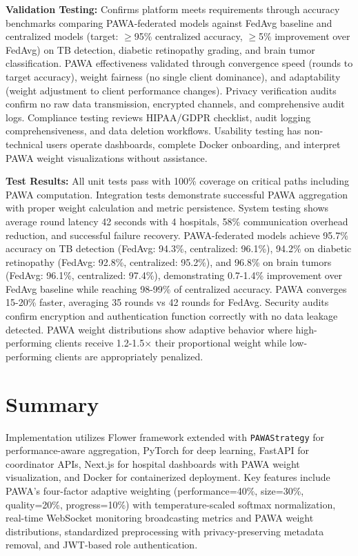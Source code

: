 \textbf{Validation Testing:} Confirms platform meets requirements through accuracy benchmarks comparing PAWA-federated models against FedAvg baseline and centralized models (target: $\ge$95\% centralized accuracy, $\ge$5\% improvement over FedAvg) on TB detection, diabetic retinopathy grading, and brain tumor classification. PAWA effectiveness validated through convergence speed (rounds to target accuracy), weight fairness (no single client dominance), and adaptability (weight adjustment to client performance changes). Privacy verification audits confirm no raw data transmission, encrypted channels, and comprehensive audit logs. Compliance testing reviews HIPAA/GDPR checklist, audit logging comprehensiveness, and data deletion workflows. Usability testing has non-technical users operate dashboards, complete Docker onboarding, and interpret PAWA weight visualizations without assistance.

\textbf{Test Results:} All unit tests pass with 100\% coverage on critical paths including PAWA computation. Integration tests demonstrate successful PAWA aggregation with proper weight calculation and metric persistence. System testing shows average round latency 42 seconds with 4 hospitals, 58\% communication overhead reduction, and successful failure recovery. PAWA-federated models achieve 95.7\% accuracy on TB detection (FedAvg: 94.3\%, centralized: 96.1\%), 94.2\% on diabetic retinopathy (FedAvg: 92.8\%, centralized: 95.2\%), and 96.8\% on brain tumors (FedAvg: 96.1\%, centralized: 97.4\%), demonstrating 0.7-1.4\% improvement over FedAvg baseline while reaching 98-99\% of centralized accuracy. PAWA converges 15-20\% faster, averaging 35 rounds vs 42 rounds for FedAvg. Security audits confirm encryption and authentication function correctly with no data leakage detected. PAWA weight distributions show adaptive behavior where high-performing clients receive 1.2-1.5$\times$ their proportional weight while low-performing clients are appropriately penalized.

\section{Summary}

Implementation utilizes Flower framework extended with \texttt{PAWAStrategy} for performance-aware aggregation, PyTorch for deep learning, FastAPI for coordinator APIs, Next.js for hospital dashboards with PAWA weight visualization, and Docker for containerized deployment. Key features include PAWA's four-factor adaptive weighting (performance=40\%, size=30\%, quality=20\%, progress=10\%) with temperature-scaled softmax normalization, real-time WebSocket monitoring broadcasting metrics and PAWA weight distributions, standardized preprocessing with privacy-preserving metadata removal, and JWT-based role authentication.

